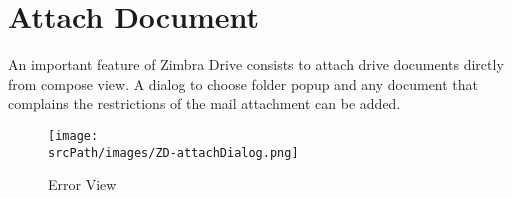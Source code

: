 \section{Attach Document}
An important feature of Zimbra Drive consists to attach drive documents dirctly from compose view.
A dialog to choose folder popup and any document that complains the restrictions of the mail attachment can be added.\\
\begin{figure}[htbp,!h] 
\centering 
\texttt{[image: \\srcPath/images/ZD-attachDialog.png]} 
\caption{Error View} 
\label{fig:errUnreachable}
\end{figure}